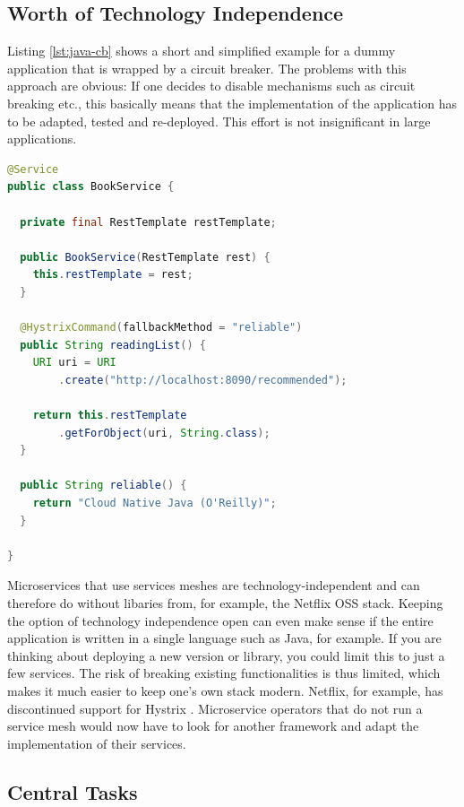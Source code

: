 \subsection{Worth of Technology Independence}

Listing \ref{lst:java-cb} shows a short and simplified example for a dummy application that is wrapped by a circuit breaker. The problems with this approach are obvious: If one decides to disable mechanisms such as circuit breaking etc., this basically means that the implementation of the application has to be adapted, tested and re-deployed. This effort is not insignificant in large applications. 

\begin{lstlisting}[basicstyle=\footnotesize ,language=java,caption={Circuit breaker example with Spring Cloud + Hystrix \cite{hystrix-ex}}, label={lst:java-cb}]
@Service
public class BookService {

  private final RestTemplate restTemplate;

  public BookService(RestTemplate rest) {
    this.restTemplate = rest;
  }

  @HystrixCommand(fallbackMethod = "reliable")
  public String readingList() {
    URI uri = URI
        .create("http://localhost:8090/recommended");

    return this.restTemplate
        .getForObject(uri, String.class);
  }

  public String reliable() {
    return "Cloud Native Java (O'Reilly)";
  }

}
\end{lstlisting}

Microservices that use services meshes are technology-independent and can therefore do without libaries from, for example, the Netflix OSS stack. Keeping the option of technology independence open can even make sense if the entire application is written in a single language such as Java, for example. If you are thinking about deploying a new version or library, you could limit this to just a few services. The risk of breaking existing functionalities is thus limited, which makes it much easier to keep one's own stack modern. Netflix, for example, has discontinued support for Hystrix \cite{hystrix-eol}. Microservice operators that do not run a service mesh would now have to look for another framework and adapt the implementation of their services.

\subsection{Central Tasks}

